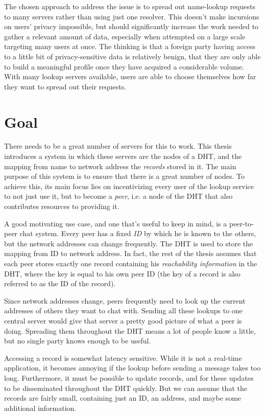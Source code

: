 The chosen approach to address the issue is to spread out name-lookup requests
to many servers rather than using just one resolver. This doesn't make
incursions on users' privacy impossible, but should significantly increase the
work needed to gather a relevant amount of data, especially when attempted on a
large scale targeting many users at once. The thinking is that a foreign party
having access to a little bit of privacy-sensitive data is relatively benign,
that they are only able to build a meaningful profile once they have acquired a
considerable volume. With many lookup servers available, users are able to
choose themselves how far they want to spread out their requests.

\section{Goal}
There needs to be a great number of servers for this to work. This thesis
introduces a system in which these servers are the nodes of a \ac{DHT}, and the
mapping from name to network address the \emph{records} stored in it. The main
purpose of this system is to ensure that there is a great number of nodes. To
achieve this, its main focus lies on incentivizing every user of the lookup
service to not just use it, but to become a \emph{peer}, i.e. a node of the
\ac{DHT} that also contributes resources to providing it.

A good motivating use case, and one that's useful to keep in mind, is a
peer-to-peer chat system. Every peer has a fixed \emph{ID} by which he is known
to the others, but the network addresses can change frequently. The \ac{DHT} is
used to store the mapping from ID to network address. In fact, the rest of the
thesis assumes that each peer stores exactly one record containing his
\emph{reachability information} in the \ac{DHT}, where the key is equal to his
own peer ID (the key of a record is also referred to as the ID of the record).

Since network addresses change, peers frequently need to look up the current
addresses of others they want to chat with. Sending all these lookups to one
central server would give that server a pretty good picture of what a peer is
doing. Spreading them throughout the \ac{DHT} means a lot of people know a
little, but no single party knows enough to be useful.

Accessing a record is somewhat latency sensitive. While it is not a real-time
application, it becomes annoying if the lookup before sending a message takes
too long. Furthermore, it must be possible to update records, and for these
updates to be disseminated throughout the \ac{DHT} quickly. But we can assume
that the records are fairly small, containing just an ID, an address, and maybe
some additional information.

